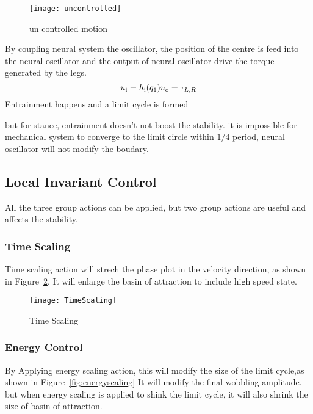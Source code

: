 \begin{figure}[!htbp]
  \begin{center}
     \texttt{[image: uncontrolled]}
    \caption{un controlled motion}
    \label{fig:stancepostures}
\end{center}
\end{figure}





By coupling neural system the oscillator, the position of the centre is feed into the neural oscillator and the output of neural oscillator drive the torque generated by the legs.
\[
u_{\mathrm{i}}=h_{\mathrm{i}}(q_1)\\
u_{\mathrm{o}}=\tau_{L,R}
\]
Entrainment happens and a limit cycle is formed

but for stance, entrainment doesn't not boost the stability.
it is impossible for mechanical system to converge to the limit circle within $1/4$ period, neural oscillator will not modify the boudary.


\subsection{Local Invariant Control}
All the three group actions can be applied, but two group actions are useful and affects the stability.
\subsubsection*{Time Scaling}
Time scaling action will strech the phase plot in the velocity direction, as shown in Figure~\ref{fig:stanceTimeScaling}.
It will enlarge the basin of attraction to include high speed state.
\begin{figure}[!htbp]
  \begin{center}
      \texttt{[image: TimeScaling]}
    \caption{Time Scaling}
    \label{fig:stanceTimeScaling}
\end{center}
\end{figure}



\subsubsection*{Energy Control}
By Applying energy scaling action, this will modify the size of the limit cycle,as shown in Figure~\ref{fig:energyscaling}
It will modify the final wobbling amplitude.
but when energy scaling is applied to shink the limit cycle,
it will also shrink the size of basin of attraction.


